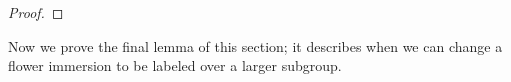 \documentclass[11pt]{article}
\theoremstyle{definition}
\newcommand{\C}{\mathcal{C}}
\begin{document}
\begin{proof}
\end{proof}

Now we prove the final lemma of this section; it describes when we can change a flower immersion to be labeled over a larger subgroup.

\end{document}
